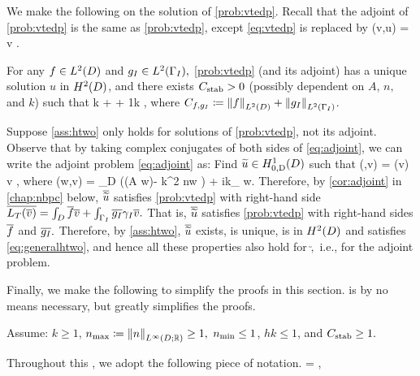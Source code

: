 We make the following  on the solution of \cref{prob:vtedp}. Recall that the adjoint of \cref{prob:vtedp} is the same as \cref{prob:vtedp}, except \cref{eq:vtedp} is replaced by
\beq\label{eq:adjoint}
\aT(v,u) =  \tforall v \in \HozDD.
\eeq

\bas\label{ass:htwo}
For any $f \in \LtD$ and $\gI \in \LtGI,$ \cref{prob:vtedp} (and its adjoint) has a unique solution $u$ in $\HtD$, and there exists $C_{\mathrm{stab}}>0$ (possibly dependent on $A$, $n,$ and $k$) such that
\beq\label{eq:generalhtwo}
k  +  + \frac1k  \leq \CAnk \Cfg,
\eeq
where $\Cfg \de \NLtD{f} + \NLtGI{\gI}$.
\eas

Suppose \cref{ass:htwo} only holds for solutions of \cref{prob:vtedp}, not its adjoint. Observe that by taking complex conjugates of both sides of \cref{eq:adjoint}, we can write the adjoint problem \cref{eq:adjoint} as: Find $\utilde \in \HozDD$ such that
\beqs
\aTadj(\utilde,v) = \FT(v) \tforall v \in \HozDD,
\eeqs
where
\beqs
\aTadj(w,v) = \int_{D} \big(\mleft(A \grad w\mright)\cdot\grad \vbar - k^2 n\minispace w \vbar\big) + ik\int_{\GI} \trGI w\minispace\trGI \vbar.
\eeqs
Therefore, by \cref{cor:adjoint} in \cref{chap:nbpc} below, $\overline{\widetilde{u}}$ satisfies \cref{prob:vtedp} with right-hand side $\overline{L_{T}(\overline{v})} = \int_D \overline{f} \overline{v} + \int_{\Gamma_{I}} \overline{g_{I}} \gamma_{I} \overline{v}.$ That is, $\overline{\widetilde{u}}$ satisfies \cref{prob:vtedp} with right-hand sides $\overline{f}$ and $\overline{g_{I}}.$ Therefore, by \cref{ass:htwo}, $\overline{\widetilde{u}}$ exists, is unique, is in $\HtD$ and satisfies \cref{eq:generalhtwo}, and hence all these properties also hold for $\utilde,$ i.e., for the adjoint problem.
\ere

Finally, we make the following  to simplify the proofs in this section.  is by no means necessary, but greatly simplifies the proofs.

\label{ass:convenient}
Assume: $k \geq 1$, $\nmax \de \NLiDRR{n} \geq 1,$ $n_{\min} \leq 1$, $hk \leq 1$, and $C_{\mathrm{stab}} \geq 1.$
\eas

Throughout this , we adopt the following piece of notation.
\beqs
\nvar = \frac{\nmax}{\nmin},
\eeqs

